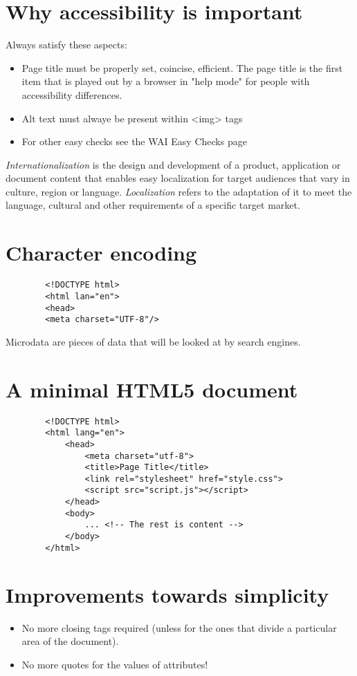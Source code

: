 \documentclass[a4paper,11pt]{book}
\begin{document}
    \section{Why accessibility is important}
    Always satisfy these aspects:
    \begin{itemize}
        \item Page title must be properly set, coincise, efficient.
            The page title is the first item that is played out by a browser
            in "help mode" for people with accessibility differences.
        \item Alt text must alwaye be present within <img> tags
        \item For other easy checks see the WAI Easy Checks page
    \end{itemize}
    \emph{Internationalization} is the design and development of a product, application
    or document content that enables easy localization for target audiences that
    vary in culture, region or language.
    \emph{Localization} refers to the adaptation of it to meet the language, cultural
    and other requirements of a specific target market.
    \section{Character encoding}
    \begin{verbatim}
        <!DOCTYPE html>
        <html lan="en">
        <head>
        <meta charset="UTF-8"/>
    \end{verbatim}

    Microdata are pieces of data that will be looked at by search engines.
    
    \section{A minimal HTML5 document}
    \begin{verbatim}
        <!DOCTYPE html>
        <html lang="en">
            <head>
                <meta charset="utf-8">
                <title>Page Title</title>
                <link rel="stylesheet" href="style.css">
                <script src="script.js"></script>
            </head>
            <body>
                ... <!-- The rest is content -->
            </body>
        </html>
    \end{verbatim}

    \section{Improvements towards simplicity}
    \begin{itemize}
    \item No more closing tags required (unless for the ones that divide a particular area
    of the document).
    \item No more quotes for the values of attributes!
    \end{itemize}
\end{document}
